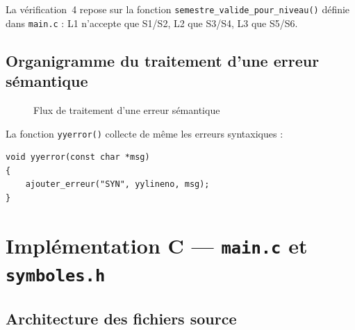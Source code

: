 \documentclass[10pt,a4paper]{article}
\begin{document}
\vspace{0.5em}
La vérification~4 repose sur la fonction \texttt{semestre\_valide\_pour\_niveau()} définie
dans \texttt{main.c} : L1 n'accepte que S1/S2, L2 que S3/S4, L3 que S5/S6.

\subsection{Organigramme du traitement d'une erreur sémantique}

\begin{figure}[h]
\centering
{}
\caption{Flux de traitement d'une erreur sémantique}
\end{figure}

La fonction \texttt{yyerror()} collecte de même les erreurs syntaxiques :

\begin{lstlisting}[style=styleBison, caption={Collecte unifiée dans \texttt{yyerror()}}]
void yyerror(const char *msg)
{
    ajouter_erreur("SYN", yylineno, msg);
}
\end{lstlisting}

\section{Implémentation C --- \texttt{main.c} et \texttt{symboles.h}}

\subsection{Architecture des fichiers source}
\end{document}

